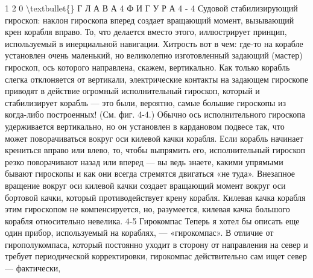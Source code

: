 \documentclass[10pt,oneside]{article}
\begin{document}
1 2 0 \textbackslash{}textbullet\{\} Г Л А В А  4 Ф И Г У Р А  4 - 4 Судовой стабилизирующий гироскоп: наклон гироскопа вперед создает вращающий момент, вызывающий крен корабля вправо. То, что делается вместо этого, иллюстрирует принцип, используемый в инерциальной навигации. Хитрость вот в чем: где-то на корабле установлен очень маленький, но великолепно изготовленный задающий (мастер) гироскоп, ось которого направлена, скажем, вертикально. Как только корабль слегка отклоняется от вертикали, электрические контакты на задающем гироскопе приводят в действие огромный исполнительный гироскоп, который и стабилизирует корабль --- это были, вероятно, самые большие гироскопы из когда-либо построенных! (См. фиг. 4-4.) Обычно ось исполнительного гироскопа удерживается вертикально, но он установлен в кардановом подвесе так, что может поворачиваться вокруг оси килевой качки корабля. Если корабль начинает крениться вправо или влево, то, чтобы выпрямить его, исполнительный гироскоп резко поворачивают назад или вперед --- вы ведь знаете, какими упрямыми бывают гироскопы и как они всегда стремятся двигаться «не туда». Внезапное вращение вокруг оси килевой качки создает вращающий момент вокруг оси бортовой качки, который противодействует крену корабля. Килевая качка корабля этим гироскопом не компенсируется, но, разумеется, килевая качка большого корабля относительно невелика. 4-5 Гирокомпас Теперь я хотел бы описать еще один прибор, используемый на кораблях, --- «гирокомпас». В отличие от гирополукомпаса, который постоянно уходит в сторону от направления на север и требует периодической корректировки, гирокомпас действительно сам ищет север --- фактически,\par
\end{document}

